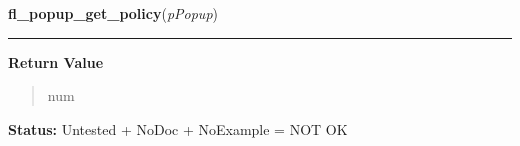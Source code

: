 \hspace{.8\funcindent}\begin{boxedminipage}{\funcwidth}

    \raggedright \textbf{fl\_popup\_get\_policy}(\textit{pPopup})

    \vspace{-1.5ex}

    \rule{\textwidth}{0.5\fboxrule}
\setlength{\parskip}{2ex}
\setlength{\parskip}{1ex}
      \textbf{Return Value}
    \vspace{-1ex}

      \begin{quote}
      num

      \end{quote}

\textbf{Status:} Untested + NoDoc + NoExample = NOT OK



    \end{boxedminipage}

    \label{xformslib:library:fl_popup_set_policy}

    \vspace{0.5ex}

